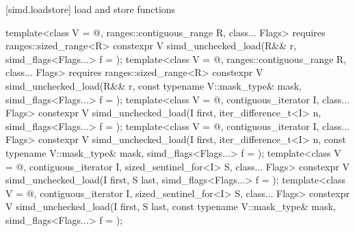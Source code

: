 [simd.loadstore]{ load and store functions}

\begin{itemdecl}
template<class V = @\seebelow@, ranges::contiguous_range R, class... Flags>
  requires ranges::sized_range<R>
  constexpr V simd_unchecked_load(R&& r, simd_flags<Flags...> f = {});
template<class V = @\seebelow@, ranges::contiguous_range R, class... Flags>
  requires ranges::sized_range<R>
  constexpr V simd_unchecked_load(R&& r, const typename V::mask_type& mask, simd_flags<Flags...> f = {});
template<class V = @\seebelow@, contiguous_iterator I, class... Flags>
  constexpr V simd_unchecked_load(I first, iter_difference_t<I> n, simd_flags<Flags...> f = {});
template<class V = @\seebelow@, contiguous_iterator I, class... Flags>
  constexpr V simd_unchecked_load(I first, iter_difference_t<I> n, const typename V::mask_type& mask,
                        simd_flags<Flags...> f = {});
template<class V = @\seebelow@, contiguous_iterator I, sized_sentinel_for<I> S, class... Flags>
  constexpr V simd_unchecked_load(I first, S last, simd_flags<Flags...> f = {});
template<class V = @\seebelow@, contiguous_iterator I, sized_sentinel_for<I> S, class... Flags>
  constexpr V simd_unchecked_load(I first, S last, const typename V::mask_type& mask,
                        simd_flags<Flags...> f = {});
\end{itemdecl}
